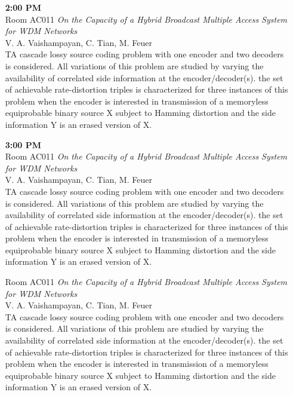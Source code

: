 \documentclass[a4,twoside,11pt]{report}
\begin{document}
\begin{enumerate}[leftmargin=3cm, labelsep=0.3cm, rightmargin=0cm, align=right, itemsep=0ex, style=multiline]
\item[{\hfill \bf 2:00 PM} \\ {\hfill Room AC011}]
{\it On the Capacity of a Hybrid Broadcast Multiple Access System for WDM Networks} \\
{V. A. Vaishampayan, C. Tian, M. Feuer} \\
{\small TA cascade lossy source coding problem with one encoder and
two decoders is considered. All variations of this problem are
studied by varying the availability of correlated side information
at the encoder/decoder(s).  the set of achievable rate-distortion
triples is characterized for three instances of this problem when
the encoder is interested in transmission of a memoryless equiprobable
binary source X subject to Hamming distortion and the side information
Y is an erased version of X.  }

\item[{\hfill \bf 3:00 PM} \\ {\hfill Room AC011}]
{\it On the Capacity of a Hybrid Broadcast Multiple Access System for WDM Networks} \\
{V. A. Vaishampayan, C. Tian, M. Feuer} \\
{\small TA cascade lossy source coding problem with one encoder and
two decoders is considered. All variations of this problem are
studied by varying the availability of correlated side information
at the encoder/decoder(s).  the set of achievable rate-distortion
triples is characterized for three instances of this problem when
the encoder is interested in transmission of a memoryless equiprobable
binary source X subject to Hamming distortion and the side information
Y is an erased version of X.  }

\item[{\hfill Room AC011}]
{\it On the Capacity of a Hybrid Broadcast Multiple Access System for WDM Networks} \\
{V. A. Vaishampayan, C. Tian, M. Feuer} \\
{\small TA cascade lossy source coding problem with one encoder and
two decoders is considered. All variations of this problem are
studied by varying the availability of correlated side information
at the encoder/decoder(s).  the set of achievable rate-distortion
triples is characterized for three instances of this problem when
the encoder is interested in transmission of a memoryless equiprobable
binary source X subject to Hamming distortion and the side information
Y is an erased version of X.  }

\end{enumerate}
\end{document}
